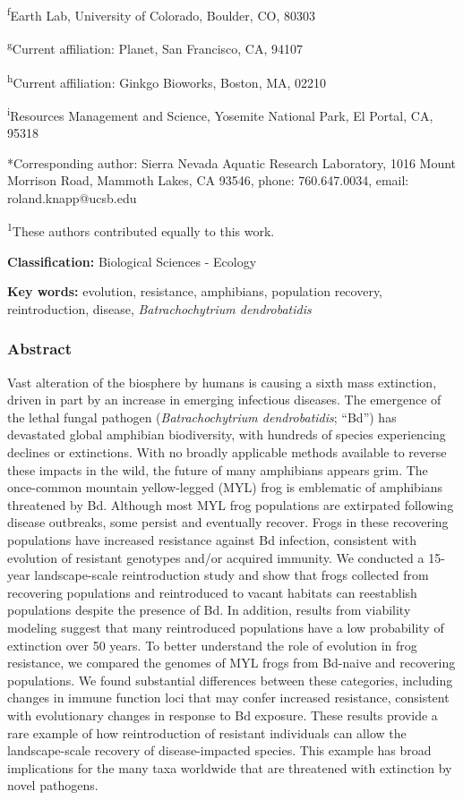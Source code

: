 \documentclass[
  letterpaper,
  DIV=11,
  numbers=noendperiod]{scrartcl}
\begin{document}
\textsuperscript{f}Earth Lab, University of Colorado, Boulder, CO, 80303

\textsuperscript{g}Current affiliation: Planet, San Francisco, CA, 94107

\textsuperscript{h}Current affiliation: Ginkgo Bioworks, Boston, MA,
02210

\textsuperscript{i}Resources Management and Science, Yosemite National
Park, El Portal, CA, 95318

*Corresponding author: Sierra Nevada Aquatic Research Laboratory, 1016
Mount Morrison Road, Mammoth Lakes, CA 93546, phone: 760.647.0034,
email: roland.knapp@ucsb.edu

\textsuperscript{1}These authors contributed equally to this work.

\textbf{Classification:} Biological Sciences - Ecology

\textbf{Key words:} evolution, resistance, amphibians, population
recovery, reintroduction, disease, \emph{Batrachochytrium dendrobatidis}

\hypertarget{abstract}{%
\subsubsection{Abstract}\label{abstract}}

Vast alteration of the biosphere by humans is causing a sixth mass
extinction, driven in part by an increase in emerging infectious
diseases. The emergence of the lethal fungal pathogen
(\emph{Batrachochytrium dendrobatidis}; ``Bd'') has devastated global
amphibian biodiversity, with hundreds of species experiencing declines
or extinctions. With no broadly applicable methods available to reverse
these impacts in the wild, the future of many amphibians appears grim.
The once-common mountain yellow-legged (MYL) frog is emblematic of
amphibians threatened by Bd. Although most MYL frog populations are
extirpated following disease outbreaks, some persist and eventually
recover. Frogs in these recovering populations have increased resistance
against Bd infection, consistent with evolution of resistant genotypes
and/or acquired immunity. We conducted a 15-year landscape-scale
reintroduction study and show that frogs collected from recovering
populations and reintroduced to vacant habitats can reestablish
populations despite the presence of Bd. In addition, results from
viability modeling suggest that many reintroduced populations have a low
probability of extinction over 50 years. To better understand the role
of evolution in frog resistance, we compared the genomes of MYL frogs
from Bd-naive and recovering populations. We found substantial
differences between these categories, including changes in immune
function loci that may confer increased resistance, consistent with
evolutionary changes in response to Bd exposure. These results provide a
rare example of how reintroduction of resistant individuals can allow
the landscape-scale recovery of disease-impacted species. This example
has broad implications for the many taxa worldwide that are threatened
with extinction by novel pathogens.
\end{document}
